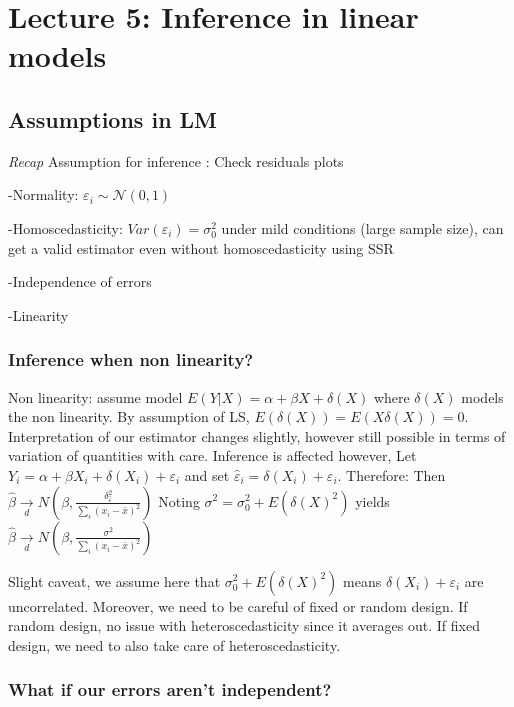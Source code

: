 \documentclass[
]{article}
\begin{document}
\hypertarget{lecture-5-inference-in-linear-models}{%
\section{Lecture 5: Inference in linear
models}\label{lecture-5-inference-in-linear-models}}

\hypertarget{assumptions-in-lm}{%
\subsection{Assumptions in LM}\label{assumptions-in-lm}}

\emph{Recap} Assumption for inference : Check residuals plots

-Normality: \(\varepsilon_i\sim\mathcal{N}(0,1)\)

-Homoscedasticity: \(Var(\varepsilon_i)=\sigma_0^2\) under mild
conditions (large sample size), can get a valid estimator even without
homoscedasticity using SSR

-Independence of errors

-Linearity

\hypertarget{inference-when-non-linearity}{%
\subsubsection{Inference when non
linearity?}\label{inference-when-non-linearity}}

Non linearity: assume model \(E(Y|X)=\alpha+\beta X+\delta(X)\) where
\(\delta(X)\) models the non linearity. By assumption of LS,
\(E(\delta(X))=E(X\delta(X))=0\). Interpretation of our estimator
changes slightly, however still possible in terms of variation of
quantities with care. Inference is affected however, Let
\(Y_i=\alpha+\beta X_i+\delta(X_i)+\varepsilon_i\) and set
\(\hat{\varepsilon}_i=\delta(X_i)+\varepsilon_i\). Therefore: Then
\(\hat{\beta}\underset{d}{\rightarrow}N(\beta,\frac{\delta_{\hat{\varepsilon}}^2}{\sum_i (x_i-\bar{x})^2})\)
Noting \(\sigma^2=\sigma_0 ^2+E(\delta(X)^2)\) yields
\(\hat{\beta}\underset{d}{\rightarrow}N(\beta,\frac{\sigma^2}{\sum_i (x_i-\bar{x})^2})\)

Slight caveat, we assume here that \(\sigma_0 ^2+E(\delta(X)^2)\) means
\(\delta(X_i)+\varepsilon_i\) are uncorrelated. Moreover, we need to be
careful of fixed or random design. If random design, no issue with
heteroscedasticity since it averages out. If fixed design, we need to
also take care of heteroscedasticity.

\hypertarget{what-if-our-errors-arent-independent}{%
\subsubsection{What if our errors aren't
independent?}\label{what-if-our-errors-arent-independent}}
\end{document}
